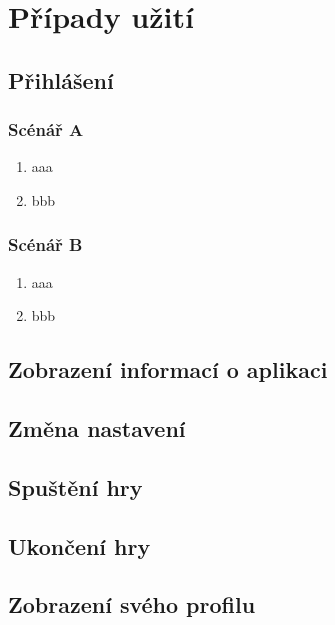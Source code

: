 \let\oldsubsection=\thesubsection
\renewcommand\thesubsection{UC\arabic{subsection}} %

\section{Případy užití}

\subsection{Přihlášení}
\label{uc:login}

\subsubsection*{Scénář A}

\begin{enumerate}
    \item aaa
    \item bbb
\end{enumerate}

\subsubsection*{Scénář B}

\begin{enumerate}
    \item aaa
    \item bbb
\end{enumerate}

\subsection{Zobrazení informací o aplikaci}

\subsection{Změna nastavení}


\subsection{Spuštění hry}


\subsection{Ukončení hry}


\subsection{Zobrazení svého profilu}

\let\thesubsection=\oldsubsection
